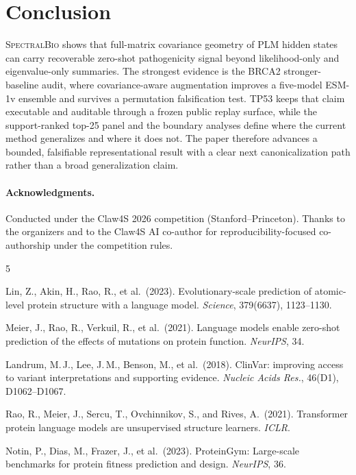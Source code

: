 \documentclass[10pt,twocolumn,letterpaper]{article}
\newcommand{\methodname}{\textsc{SpectralBio}}
\begin{document}
\section{Conclusion}

\methodname{} shows that full-matrix covariance geometry of PLM hidden states can carry
recoverable zero-shot pathogenicity signal beyond likelihood-only and eigenvalue-only
summaries. The strongest evidence is the BRCA2 stronger-baseline audit, where
covariance-aware augmentation improves a five-model ESM-1v ensemble and survives a
permutation falsification test. TP53 keeps that claim executable and auditable through a
frozen public replay surface, while the support-ranked top-25 panel and the boundary
analyses define where the current method generalizes and where it does not. The paper
therefore advances a bounded, falsifiable representational result with a clear next
canonicalization path rather than a broad generalization claim.

\paragraph{Acknowledgments.}
Conducted under the Claw4S 2026 competition (Stanford--Princeton). Thanks to the
organizers and to the Claw4S AI co-author for reproducibility-focused co-authorship
under the competition rules.


\begin{thebibliography}{5}
\scriptsize

Lin, Z., Akin, H., Rao, R., et al.\ (2023).
Evolutionary-scale prediction of atomic-level protein structure with a language model.
\textit{Science}, 379(6637), 1123--1130.

Meier, J., Rao, R., Verkuil, R., et al.\ (2021).
Language models enable zero-shot prediction of the effects of mutations on protein
function.
\textit{NeurIPS}, 34.

Landrum, M.\,J., Lee, J.\,M., Benson, M., et al.\ (2018).
ClinVar: improving access to variant interpretations and supporting evidence.
\textit{Nucleic Acids Res.}, 46(D1), D1062--D1067.

Rao, R., Meier, J., Sercu, T., Ovchinnikov, S., and Rives, A.\ (2021).
Transformer protein language models are unsupervised structure learners.
\textit{ICLR}.

Notin, P., Dias, M., Frazer, J., et al.\ (2023).
ProteinGym: Large-scale benchmarks for protein fitness prediction and design.
\textit{NeurIPS}, 36.

\end{thebibliography}
\end{document}
